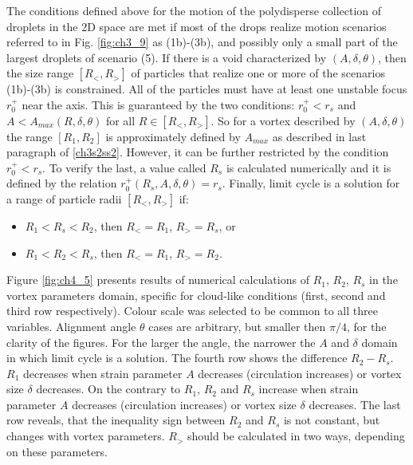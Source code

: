 \documentclass[../main.tex]{subfiles}
\begin{document}
The conditions defined above for the motion of the polydisperse collection of droplets in the 2D space are met if most of the drops realize motion scenarios referred to in Fig. \autoref{fig:ch3_9} as (1b)-(3b), and possibly only a small part of the largest droplets of scenario (5). If there is a void characterized by $(A,\delta,\theta)$, then the size range $[R_<,R_>]$ of particles that realize one or more of the scenarios (1b)-(3b) is constrained. All of the particles must have at least one unstable focus $r^+_0$ near the axis. This is guaranteed by the two conditions: $r^+_0<r_s$ and $A<A_{max}(R,\delta,\theta)$ for all $R \in [R_<,R_>]$. So for a vortex described by $(A, \delta, \theta)$ the range $[R_1,R_2]$ is approximately defined by $A_{max}$ as described in last paragraph of \autoref{ch3s2ss2}. However, it can be further restricted by the condition $r^+_0<r_s$. To verify the last, a value called $R_s$ is calculated numerically and it is defined by the relation $r^+_0(R_s,A,\delta,\theta)=r_s$. Finally, limit cycle is a solution for a range of particle radii $[R_<,R_>]$ if:
\begin{itemize}
\item $R_1<R_s<R_2$, then $R_<=R_1$, $R_>=R_s$, or
\item $R_1<R_2<R_s$, then $R_<=R_1$, $R_>=R_2$.
\end{itemize}
Figure \ref{fig:ch4_5} presents results of numerical calculations of $R_1$, $R_2$, $R_s$ in the vortex parameters domain, specific for cloud-like conditions (first, second and third row respectively). Colour scale was selected to be common to all three variables. Alignment angle $\theta$ cases are arbitrary, but smaller then $\pi/4$, for the clarity of the figures. For the larger the angle, the narrower the $A$ and $\delta$ domain in which limit cycle is a solution. The fourth row shows the difference $R_2-R_s$. $R_1$ decreases when strain parameter $A$ decreases (circulation increases) or vortex size $\delta$ decreases. On the contrary to $R_1$, $R_2$ and $R_s$ increase when strain parameter $A$ decreases (circulation increases) or vortex size $\delta$ decreases. The last row reveals, that the inequality sign between $R_2$ and $R_s$ is not constant, but changes with vortex parameters. $R_>$ should be calculated in two ways, depending on these parameters.
\end{document}
